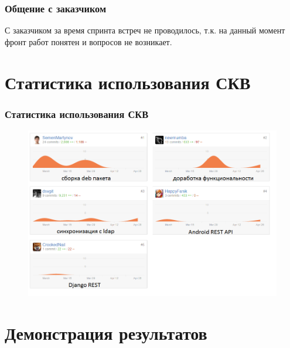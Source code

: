 \documentclass{beamer}
\begin{document}
\begin{frame}
\frametitle{Общение с заказчиком}

С заказчиком за время спринта встреч не проводилось, т.к. на данный момент фронт работ понятен и вопросов не возникает.

\end{frame}

\section{Статистика использования СКВ}

\begin{frame}
\frametitle{Статистика использования СКВ}

\begin{figure}
\includegraphics[scale=0.47]{res/r3_stat}
\end{figure}

\end{frame}

\section{Демонстрация результатов}
\end{document}
